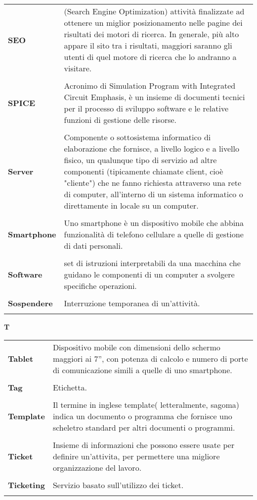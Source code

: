 \begin{longtable}{L{4cm} p{10cm}}
\textbf{SEO} & (Search Engine Optimization) attività finalizzate ad ottenere un miglior posizionamento nelle pagine dei risultati dei motori di ricerca. In generale, più alto appare il sito tra i risultati, maggiori saranno gli utenti di quel motore di ricerca che lo andranno a visitare. \\ 
 \\ 
\textbf{SPICE} & Acronimo di Simulation Program with Integrated Circuit Emphasis, è un insieme di documenti tecnici per il processo di sviluppo software e le relative funzioni di gestione delle risorse. \\ 
 \\ 
\textbf{Server} & Componente o sottosistema informatico di elaborazione che fornisce, a livello logico e a livello fisico, un qualunque tipo di servizio ad altre componenti (tipicamente chiamate client, cioè "cliente") che ne fanno richiesta attraverso una rete di computer, all'interno di un sistema informatico o direttamente in locale su un computer. \\ 
 \\ 
\textbf{Smartphone} & Uno smartphone è un dispositivo mobile che abbina funzionalità di telefono cellulare a quelle di gestione di dati personali. \\ 
 \\ 
\textbf{Software} & set di istruzioni interpretabili da una macchina che guidano le componenti di un computer a svolgere specifiche operazioni. \\ 
 \\ 
\textbf{Sospendere} & Interruzione temporanea di un’attività. \\ 
 \\ 
\end{longtable} 
\newpage 
{} 
{} 
\hfill\Huge{\textbf{T}} \\ 
\normalsize 
\begin{longtable}{L{4cm} p{10cm}}
\textbf{Tablet} & Dispositivo mobile con dimensioni dello schermo maggiori ai 7”, con potenza di calcolo e numero di porte di comunicazione simili a quelle di uno smartphone. \\ 
 \\ 
\textbf{Tag} & Etichetta. \\ 
 \\ 
\textbf{Template} & Il termine in inglese template( letteralmente, sagoma) indica un documento o programma che fornisce uno scheletro standard per altri documenti o programmi. \\ 
 \\ 
\textbf{Ticket} & Insieme di informazioni che possono essere usate per definire un’attivita, per permettere una migliore organizzazione del lavoro. \\ 
 \\ 
\textbf{Ticketing} & Servizio basato sull’utilizzo dei ticket. \\ 
 \\ 
\end{longtable} 
